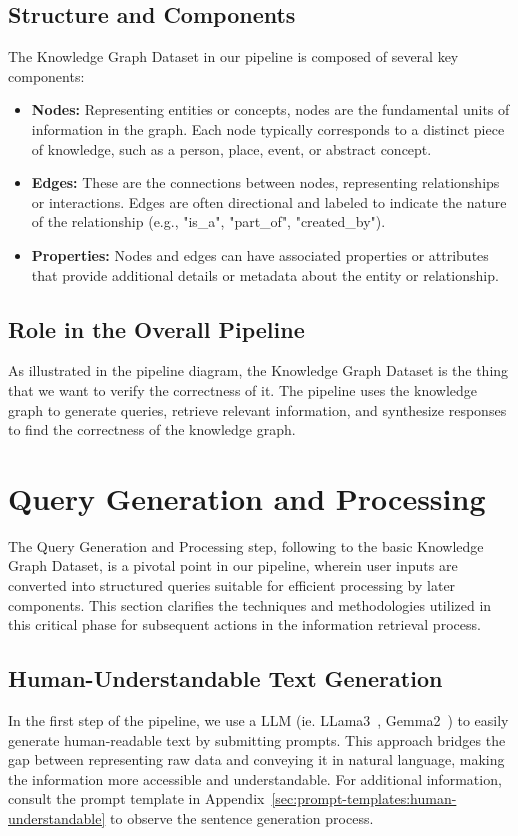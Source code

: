\subsection{Structure and Components}\label{subsec:structure-and-components}
The Knowledge Graph Dataset in our pipeline is composed of several key components:
\begin{itemize}
    \item \textbf{Nodes:} Representing entities or concepts, nodes are the fundamental units of information in the graph. Each node typically corresponds to a distinct piece of knowledge, such as a person, place, event, or abstract concept.
    \item \textbf{Edges:} These are the connections between nodes, representing relationships or interactions. Edges are often directional and labeled to indicate the nature of the relationship (e.g., "is\_a", "part\_of", "created\_by").
    \item \textbf{Properties:} Nodes and edges can have associated properties or attributes that provide additional details or metadata about the entity or relationship.
\end{itemize}

\subsection{Role in the Overall Pipeline}\label{subsec:role-in-the-overall-pipeline}
As illustrated in the pipeline diagram, the Knowledge Graph Dataset is the thing that we want to verify the correctness of it.
The pipeline uses the knowledge graph to generate queries, retrieve relevant information, and synthesize responses to find the correctness of the knowledge graph.

\section{Query Generation and Processing}\label{sec:query-generation-and-processing}
The Query Generation and Processing step, following to the basic Knowledge Graph Dataset, is a pivotal point in our pipeline, wherein user inputs are converted into structured queries suitable for efficient processing by later components.
This section clarifies the techniques and methodologies utilized in this critical phase for subsequent actions in the information retrieval process.

\subsection{Human-Understandable Text Generation}\label{subsec:human-understandable-text-generation}
In the first step of the pipeline, we use a LLM (ie. LLama3~\cite{dubey2024llama3herdmodels}, Gemma2~\cite{gemmateam2024gemma2improvingopen}) to easily generate human-readable text by submitting prompts.
This approach bridges the gap between representing raw data and conveying it in natural language, making the information more accessible and understandable.
For additional information, consult the prompt template in Appendix~\ref{sec:prompt-templates:human-understandable} to observe the sentence generation process.

